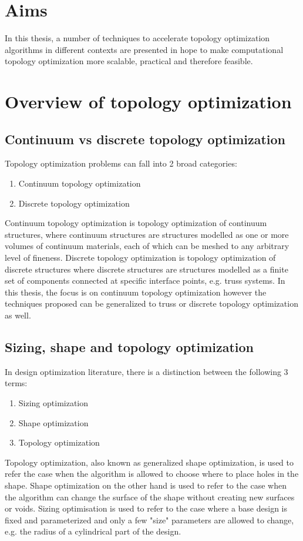 \newpage
\section{Aims}

In this thesis, a number of techniques to accelerate topology optimization algorithms in different contexts are presented in hope to make computational topology optimization more scalable, practical and therefore feasible.

\newpage
\section{Overview of topology optimization}

\subsection{Continuum vs discrete topology optimization}

Topology optimization problems can fall into 2 broad categories:
\begin{enumerate}
    \item Continuum topology optimization
    \item Discrete topology optimization
\end{enumerate}
Continuum topology optimization is topology optimization of continuum structures, where continuum structures are structures modelled as one or more volumes of continuum materials, each of which can be meshed to any arbitrary level of fineness. Discrete topology optimization is topology optimization of discrete structures where discrete structures are structures modelled as a finite set of components connected at specific interface points, e.g. truss systems. In this thesis, the focus is on continuum topology optimization however the techniques proposed can be generalized to truss or discrete topology optimization as well.

\subsection{Sizing, shape and topology optimization}

In design optimization literature, there is a distinction between the following 3 terms:
\begin{enumerate}
    \item Sizing optimization
    \item Shape optimization
    \item Topology optimization
\end{enumerate}
Topology optimization, also known as generalized shape optimization, is used to refer the case when the algorithm is allowed to choose where to place holes in the shape. Shape optimization on the other hand is used to refer to the case when the algorithm can change the surface of the shape without creating new surfaces or voids. Sizing optimisation is used to refer to the case where a base design is fixed and parameterized and only a few "size" parameters are allowed to change, e.g. the radius of a cylindrical part of the design.

